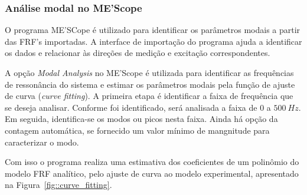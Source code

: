 








\subsubsection{Análise modal no ME'Scope}

O programa ME'SCope é utilizado para identificar os parâmetros modais a partir
das FRF's importadas. A interface de importação do programa ajuda a identificar
os dados e relacionar às direções de medição e excitação correspondentes.

A opção \textit{Modal Analysis} no ME'Scope é utilizada para identificar as
frequências de ressonância do sistema e estimar os parâmetros modais pela função
de ajuste de curva (\textit{curve fitting}). A primeira etapa é identificar a
faixa de frequência que se deseja analisar. Conforme foi identificado, será
analisada a faixa de $0$ a $500~Hz$. Em seguida, identifica-se os modos ou picos
nesta faixa. Ainda há opção da contagem automática, se fornecido um valor
mínimo de mangnitude para caracterizar o modo.


Com isso o programa realiza uma estimativa dos coeficientes de um polinômio do
modelo FRF analítico, pelo ajuste de curva ao modelo experimental, apresentado
na Figura~\ref{fig::curve_fitting}. 

